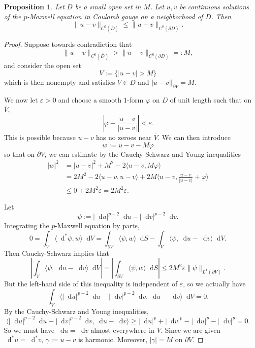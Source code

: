 \documentclass[reqno,11pt]{amsart}
\newcommand*\dif{\mathop{}\!\mathrm{d}}
\newtheorem{proposition}[theorem]{Proposition}
\theoremstyle{definition}
\numberwithin{equation}{section}
\begin{document}
\begin{proposition}
Let $D$ be a small open set in $M$.
Let $u, v$ be continuous solutions of the $p$-Maxwell equation in Coulomb gauge on a neighborhood of $\overline D$.
Then
$$\|u - v\|_{C^0(\overline D)} \leq \|u - v\|_{C^0(\partial D)}.$$
\end{proposition}
\begin{proof}
Suppose towards contradiction that
$$\|u - v\|_{C^0(\overline D)} > \|u - v\|_{C^0(\partial D)} =: M,$$
and consider the open set
$$V := \{|u - v| > M\}$$
which is then nonempty and satisfies $V \Subset D$ and $|u - v||_{\partial V} = M$.

We now let $\varepsilon > 0$ and choose a smooth $1$-form $\varphi$ on $D$ of unit length such that on $\overline V$,
$$\left|\varphi - \frac{u - v}{|u - v|}\right| < \varepsilon.$$
This is possible because $u - v$ has no zeroes near $\overline V$.
We can then introduce 
$$w := u - v - M\varphi$$
so that on $\partial V$, we can estimate by the Cauchy-Schwarz and Young inequalities
\begin{align*}
|w|^2 &= |u - v|^2 + M^2 - 2\langle u - v, M\varphi\rangle  \\
&= 2M^2 - 2\langle u - v, u - v\rangle + 2M \langle u - v, \frac{u - v}{|u - v|} + \varphi\rangle \\
&\leq 0 + 2M^2 \varepsilon = 2M^2 \varepsilon.
\end{align*}

Let
$$\psi := |\dif u|^{p - 2} \dif u - |\dif v|^{p - 2} \dif v.$$
Integrating the $p$-Maxwell equation by parts,
$$0 = \int_V \langle \dif^* \psi, w\rangle \dif V = \int_{\partial V} \langle \psi, w\rangle \dif S - \int_V \langle \psi, \dif u - \dif v\rangle \dif V.$$
Then Cauchy-Schwarz implies that 
$$\left|\int_V \langle \psi, \dif u - \dif v\rangle \dif V\right| = \left|\int_{\partial V} \langle \psi, w\rangle \dif S\right| \leq 2M^2 \varepsilon \|\psi\|_{L^1(\partial V)}.$$
But the left-hand side of this inequality is independent of $\varepsilon$, so we actually have 
$$\int_V \langle |\dif u|^{p - 2} \dif u - |\dif v|^{p - 2} \dif v, \dif u - \dif v\rangle \dif V = 0.$$
By the Cauchy-Schwarz and Young inequalities,
$$\langle |\dif u|^{p - 2} \dif u - |\dif v|^{p - 2} \dif v, \dif u - \dif v\rangle \geq |\dif u|^p + |\dif v|^p - |\dif u|^p - |\dif v|^p = 0.$$
So we must have $\dif u = \dif v$ almost everywhere in $V$.
Since we are given $\dif^* u = \dif^* v$, $\gamma := u - v$ is harmonic.
Moreover, $|\gamma| = M$ on $\partial V$.


\end{proof}
\end{document}
